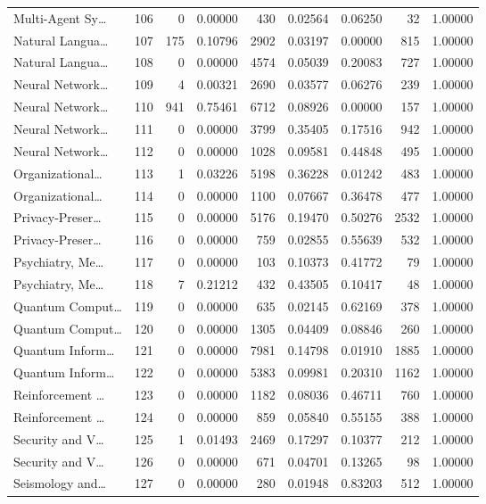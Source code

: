 \begin{table}
\begin{tabular}{lrrrrrrrr}
Multi-Agent Sy… & 106 & 0 & 0.00000 & 430 & 0.02564 & 0.06250 & 32 & 1.00000 \\
Natural Langua… & 107 & 175 & 0.10796 & 2902 & 0.03197 & 0.00000 & 815 & 1.00000 \\
Natural Langua… & 108 & 0 & 0.00000 & 4574 & 0.05039 & 0.20083 & 727 & 1.00000 \\
Neural Network… & 109 & 4 & 0.00321 & 2690 & 0.03577 & 0.06276 & 239 & 1.00000 \\
Neural Network… & 110 & 941 & 0.75461 & 6712 & 0.08926 & 0.00000 & 157 & 1.00000 \\
Neural Network… & 111 & 0 & 0.00000 & 3799 & 0.35405 & 0.17516 & 942 & 1.00000 \\
Neural Network… & 112 & 0 & 0.00000 & 1028 & 0.09581 & 0.44848 & 495 & 1.00000 \\
Organizational… & 113 & 1 & 0.03226 & 5198 & 0.36228 & 0.01242 & 483 & 1.00000 \\
Organizational… & 114 & 0 & 0.00000 & 1100 & 0.07667 & 0.36478 & 477 & 1.00000 \\
Privacy-Preser… & 115 & 0 & 0.00000 & 5176 & 0.19470 & 0.50276 & 2532 & 1.00000 \\
Privacy-Preser… & 116 & 0 & 0.00000 & 759 & 0.02855 & 0.55639 & 532 & 1.00000 \\
Psychiatry, Me… & 117 & 0 & 0.00000 & 103 & 0.10373 & 0.41772 & 79 & 1.00000 \\
Psychiatry, Me… & 118 & 7 & 0.21212 & 432 & 0.43505 & 0.10417 & 48 & 1.00000 \\
Quantum Comput… & 119 & 0 & 0.00000 & 635 & 0.02145 & 0.62169 & 378 & 1.00000 \\
Quantum Comput… & 120 & 0 & 0.00000 & 1305 & 0.04409 & 0.08846 & 260 & 1.00000 \\
Quantum Inform… & 121 & 0 & 0.00000 & 7981 & 0.14798 & 0.01910 & 1885 & 1.00000 \\
Quantum Inform… & 122 & 0 & 0.00000 & 5383 & 0.09981 & 0.20310 & 1162 & 1.00000 \\
Reinforcement … & 123 & 0 & 0.00000 & 1182 & 0.08036 & 0.46711 & 760 & 1.00000 \\
Reinforcement … & 124 & 0 & 0.00000 & 859 & 0.05840 & 0.55155 & 388 & 1.00000 \\
Security and V… & 125 & 1 & 0.01493 & 2469 & 0.17297 & 0.10377 & 212 & 1.00000 \\
Security and V… & 126 & 0 & 0.00000 & 671 & 0.04701 & 0.13265 & 98 & 1.00000 \\
Seismology and… & 127 & 0 & 0.00000 & 280 & 0.01948 & 0.83203 & 512 & 1.00000 \\

\end{tabular}
\end{table}
